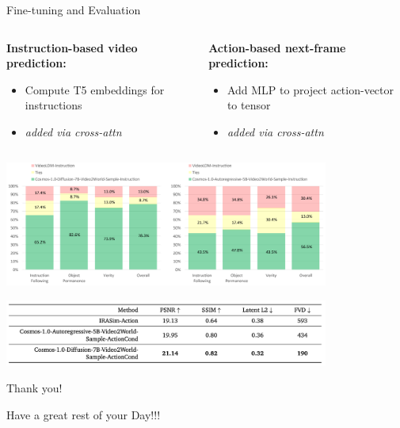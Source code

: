 \documentclass{beamer}
\begin{document}
\begin{frame}{Fine-tuning and Evaluation}
    \vspace{-0.5em}
	\begin{columns}[t]
		\begin{column}{.5\textwidth}
            \small
            \textbf{Instruction-based video prediction:}
            \begin{itemize}[label=-]
                \item Compute T5 embeddings for instructions
                \item \textit{added via cross-attn}
            \end{itemize}
		\end{column}
		\begin{column}{.5\textwidth}
            \small
            \textbf{Action-based next-frame prediction:}
            \begin{itemize}[label=-]
                \item Add MLP to project action-vector to tensor
                \item \textit{added via cross-attn}
            \end{itemize}
		\end{column}
	\end{columns}
    \begin{center}
        \includegraphics[width=0.8\textwidth]{./img/post_res_inst.png}
    \end{center}
    \begin{center}
        \includegraphics[width=0.8\textwidth]{./img/post_res_action.png}
    \end{center}
\end{frame}

\begin{frame}{Thank you!}
	\begin{center}
        Have a great rest of your Day!!!
	\end{center}
	\begin{center}
	\end{center}
\end{frame}
\end{document}

